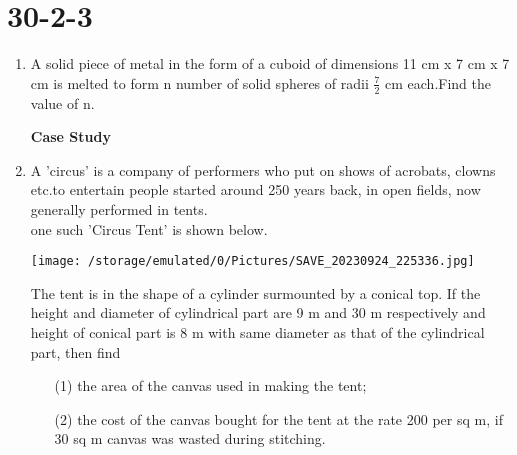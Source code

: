 \documentclass[15pt]{article}
\begin{document}
    \section{30-2-3}
    \begin{enumerate}
       \item A solid piece of metal in the form of a cuboid of dimensions 11 cm x 7 cm x 7 cm is melted to form n number of solid spheres of radii $\displaystyle\frac{7}{2}$ cm each.Find the value of n.
         \begin{center}
             \textbf{Case Study}
         \end{center}
      \item  A 'circus' is a company of performers who put on shows of acrobats, clowns etc.to entertain people started around 250 years back, in open fields, now generally performed in tents.  \\
     one such 'Circus Tent' is shown below.
     \begin{center}
          \texttt{[image:              /storage/emulated/0/Pictures/SAVE\_20230924\_225336.jpg]}
     \end{center}
     The tent is in the shape of a cylinder surmounted by a conical top. If the height and diameter of cylindrical part are 9 m and 30 m respectively and height of conical part is 8 m with same diameter as that of the cylindrical part, then find
     \begin{enumerate}
         \item [(1)] the area of the canvas used in making the tent;
         \item [(2)] the cost of the canvas bought for the tent at the rate \rupee \hspace{0.1cm}200 per sq m, if 30 sq m canvas was wasted during stitching.
     \end{enumerate}
\end{enumerate}
\end{document}
